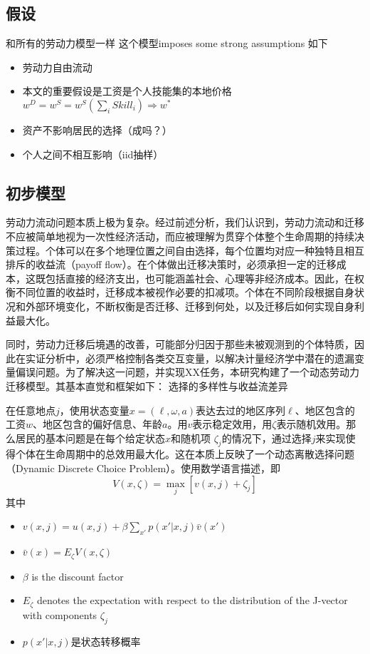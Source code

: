 \documentclass[a4paper,10pt]{article}
\begin{document}
\subsection{假设}
和所有的劳动力模型一样 这个模型imposes some strong assumptions
如下
\begin{itemize}
\item 劳动力自由流动
\item 本文的重要假设是工资是个人技能集的本地价格$w^{D}=w^{S}=w^{S}(\sum\limits_{i}Skill_{i})\Rightarrow w^{*}$
\item 资产不影响居民的选择（成吗？）
\item 个人之间不相互影响（iid抽样）
\end{itemize}


\subsection{初步模型}
劳动力流动问题本质上极为复杂。经过前述分析，我们认识到，劳动力流动和迁移不应被简单地视为一次性经济活动，而应被理解为贯穿个体整个生命周期的持续决策过程。个体可以在多个地理位置之间自由选择，每个位置均对应一种独特且相互排斥的收益流（payoff flow）。在个体做出迁移决策时，必须承担一定的迁移成本，这既包括直接的经济支出，也可能涵盖社会、心理等非经济成本。因此，在权衡不同位置的收益时，迁移成本被视作必要的扣减项。个体在不同阶段根据自身状况和外部环境变化，不断权衡是否迁移、迁移到何处，以及迁移后如何实现自身利益最大化。

同时，劳动力迁移后境遇的改善，可能部分归因于那些未被观测到的个体特质，因此在实证分析中，必须严格控制各类交互变量，以解决计量经济学中潜在的遗漏变量偏误问题。为了解决这一问题，并实现XX任务，本研究构建了一个动态劳动力迁移模型。其基本直觉和框架如下：
选择的多样性与收益流差异

在任意地点$j$，使用状态变量$x=(\ell,\omega,a)$表达去过的地区序列$\ell$、地区包含的工资$w$、地区包含的偏好信息、年龄$a$。用$v$表示稳定效用，用$\zeta$表示随机效用。那么居民的基本问题是在每个给定状态$x$和随机项 $\zeta_j$的情况下，通过选择$j$来实现使得个体在生命周期中的总效用最大化。这在本质上反映了一个动态离散选择问题（Dynamic Discrete Choice Problem）。使用数学语言描述，即
\begin{equation}
V(x,\zeta)=\max\limits_{j}[v(x,j)+\zeta_{j}]
\end{equation}
其中
\begin{itemize}
\item $v(x, j) = u(x, j) + \beta \sum_{x'} p(x' | x, j) \bar{v}(x')$
\item $\bar{v}(x) = E_{\zeta} V(x, \zeta)$
\item $\beta$ is the discount factor
\item $E_{\zeta}$ denotes the expectation with respect to the distribution of the J-vector with components $\zeta_{j}$
\item $p(x'|x,j)$是状态转移概率
\end{itemize}
\end{document}
